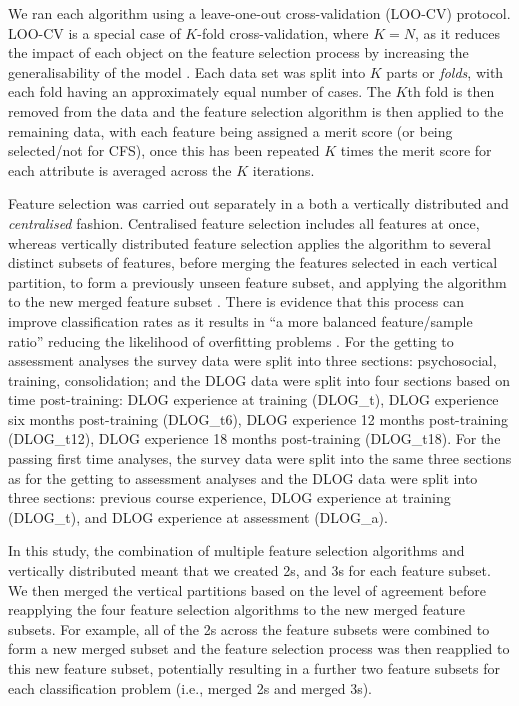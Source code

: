 \documentclass[
  12pt,
  a4paper,
]{book}
\begin{document}
We ran each algorithm using a leave-one-out cross-validation (LOO-CV) protocol. LOO-CV is a special case of \(K\)-fold cross-validation, where \(K = N\), as it reduces the impact of each object on the feature selection process by increasing the generalisability of the model \citep{Hastie2009, DeRooij2020}. Each data set was split into \(K\) parts or \emph{folds}, with each fold having an approximately equal number of cases. The \(K\)th fold is then removed from the data and the feature selection algorithm is then applied to the remaining data, with each feature being assigned a merit score (or being selected/not for CFS), once this has been repeated \(K\) times the merit score for each attribute is averaged across the \(K\) iterations.

Feature selection was carried out separately in a both a vertically distributed and \emph{centralised} fashion. Centralised feature selection includes all features at once, whereas vertically distributed feature selection applies the algorithm to several distinct subsets of features, before merging the features selected in each vertical partition, to form a previously unseen feature subset, and applying the algorithm to the new merged feature subset \citep[see][]{Bolon-Canedo2015}. There is evidence that this process can improve classification rates as it results in ``a more balanced feature/sample ratio'' reducing the likelihood of overfitting problems \citep[p 137]{Bolon-Canedo2015a}. For the getting to assessment analyses the survey data were split into three sections: psychosocial, training, consolidation; and the DLOG data were split into four sections based on time post-training: DLOG experience at training (DLOG\_t), DLOG experience six months post-training (DLOG\_t6), DLOG experience 12 months post-training (DLOG\_t12), DLOG experience 18 months post-training (DLOG\_t18). For the passing first time analyses, the survey data were split into the same three sections as for the getting to assessment analyses and the DLOG data were split into three sections: previous course experience, DLOG experience at training (DLOG\_t), and DLOG experience at assessment (DLOG\_a).

In this study, the combination of multiple feature selection algorithms and vertically distributed meant that we created 2s, and 3s for each feature subset. We then merged the vertical partitions based on the level of agreement before reapplying the four feature selection algorithms to the new merged feature subsets. For example, all of the 2s across the feature subsets were combined to form a new merged subset and the feature selection process was then reapplied to this new feature subset, potentially resulting in a further two feature subsets for each classification problem (i.e., merged 2s and merged 3s).
\end{document}
